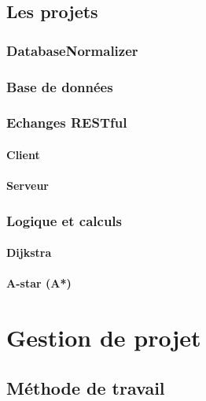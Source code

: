 \documentclass{article}
\begin{document}
\subsection{Les projets}

\subsubsection{DatabaseNormalizer}

\subsubsection{Base de données}

\subsubsection{Echanges RESTful}

\paragraph{Client}

\paragraph{Serveur}

\subsubsection{Logique et calculs}

\paragraph{Dijkstra}

\paragraph{A-star (A*)}

\newpage


\section{Gestion de projet}

\subsection{Méthode de travail}
\end{document}
